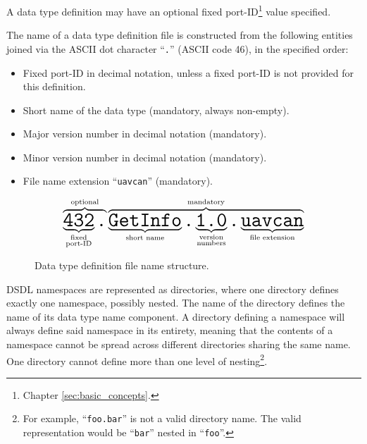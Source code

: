 A data type definition may have an optional fixed port-ID\footnote{Chapter \ref{sec:basic_concepts}.} value specified.

The name of a data type definition file is constructed from the following entities
joined via the ASCII dot character ``\verb|.|'' (ASCII code 46), in the specified order:
\begin{itemize}
    \item Fixed port-ID in decimal notation, unless a fixed port-ID is not provided for this definition.
    \item Short name of the data type (mandatory, always non-empty).
    \item Major version number in decimal notation (mandatory).
    \item Minor version number in decimal notation (mandatory).
    \item File name extension ``\verb|uavcan|'' (mandatory).
\end{itemize}

\begin{figure}[H]
    $$
    \overbrace{%
        \underbrace{\texttt{\huge{432}}}_{\substack{\text{fixed} \\ \text{port-ID}}}%
        \texttt{\huge{.}}%
    }^{\text{optional}}%
    \overbrace{%
        \underbrace{\texttt{\huge{GetInfo}}}_{\substack{\text{short name}}}%
        \texttt{\huge{.}}%
        \underbrace{\texttt{\huge{1.0}}}_{\substack{\text{version} \\ \text{numbers}}}%
        \texttt{\huge{.}}%
        \underbrace{\texttt{\huge{uavcan}}}_{\text{file extension}}%
    }^{\text{mandatory}}
    $$
    \caption{Data type definition file name structure.\label{fig:dsdl_definition_file_name_structure}}
\end{figure}

DSDL namespaces are represented as directories, where one directory defines exactly one namespace, possibly nested.
The name of the directory defines the name of its data type name component.
A directory defining a namespace will always define said namespace in its entirety,
meaning that the contents of a namespace cannot be spread across different directories sharing the same name.
One directory cannot define more than one level of
nesting\footnote{For example, ``\texttt{foo.bar}'' is not a valid directory name.
The valid representation would be ``\texttt{bar}'' nested in ``\texttt{foo}''.}.

